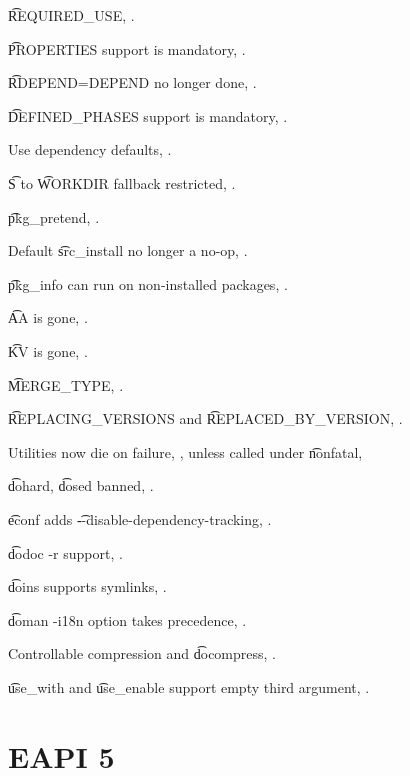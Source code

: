 \begin{compactitem}
\item \t{REQUIRED_USE}, .
\item \t{PROPERTIES} support is mandatory, .
\item \t{RDEPEND=DEPEND} no longer done, .
\item \t{DEFINED_PHASES} support is mandatory, .
\item Use dependency defaults, .
\item \t{S} to \t{WORKDIR} fallback restricted, .
\item \t{pkg_pretend}, .
\item Default \t{src_install} no longer a no-op, .
\item \t{pkg_info} can run on non-installed packages, .
\item \t{AA} is gone, .
\item \t{KV} is gone, .
\item \t{MERGE_TYPE}, .
\item \t{REPLACING_VERSIONS} and \t{REPLACED_BY_VERSION}, .
\item Utilities now die on failure, , unless called under \t{nonfatal},
\item \t{dohard}, \t{dosed} banned, .
\item \t{econf} adds \t{-{}-disable-dependency-tracking}, .
\item \t{dodoc -r} support, .
\item \t{doins} supports symlinks, .
\item \t{doman -i18n} option takes precedence, .
\item Controllable compression and \t{docompress}, .
\item \t{use_with} and \t{use_enable} support empty third argument, .
\end{compactitem}

\section{EAPI 5}

